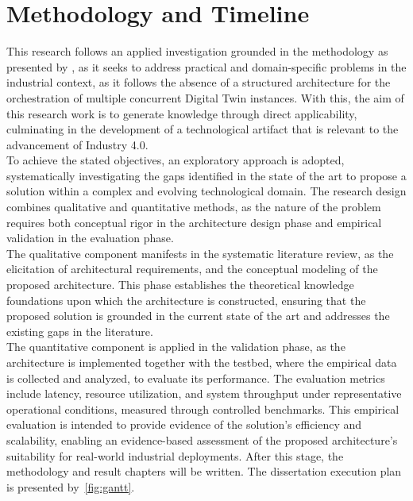 \chapter{Methodology and Timeline}
\label{sec:methodology_and_timeline}
This research follows an applied investigation grounded in the \DSR methodology as presented by , 
as it seeks to address practical and domain-specific problems in the industrial context, as it follows the absence of a structured 
architecture for the orchestration of multiple concurrent Digital Twin instances. With this, the aim of this research work  is to 
generate knowledge through direct applicability, culminating in the development of a technological artifact that is relevant to the 
advancement of Industry 4.0.\\
To achieve the stated objectives, an exploratory approach is adopted, systematically investigating the gaps identified in the state 
of the art to propose a solution within a complex and evolving technological domain. The research design combines qualitative and 
quantitative methods, as the nature of the problem requires both conceptual rigor in the architecture design phase and empirical 
validation in the evaluation phase.\\
The qualitative component manifests in the systematic literature review, as the elicitation of architectural requirements, and the 
conceptual modeling of the proposed architecture. This phase establishes the theoretical knowledge foundations upon which the 
architecture is constructed, ensuring that the proposed solution is grounded in the current state of the art and addresses the 
existing gaps in the literature.\\
The quantitative component is applied in the validation phase, as the architecture is implemented together with the \DT testbed, 
where the empirical data is collected and analyzed, to evaluate its performance. The evaluation metrics include latency, 
resource utilization, and system throughput under representative operational conditions, measured through controlled benchmarks. 
This empirical evaluation is intended to provide evidence of the solution's efficiency and scalability, enabling an evidence-based 
assessment of the proposed architecture's suitability for real-world industrial deployments. After this stage, the methodology and 
result chapters will be written. The dissertation execution plan is presented by~\autoref{fig:gantt}.

